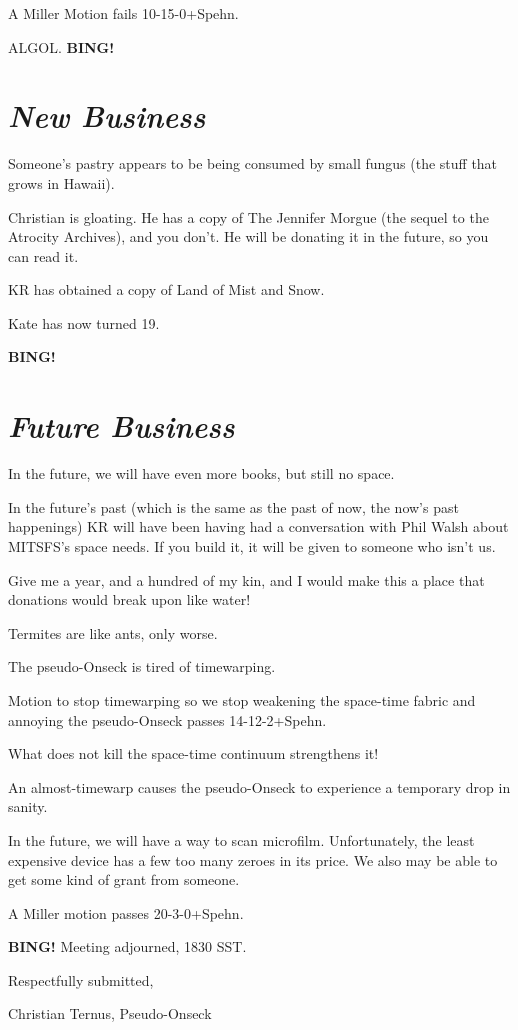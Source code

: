 \documentclass[10pt]{article}
\newcommand{\bing}{{\bf BING!} }
\newcommand{\goto}[1]{\bing \vskip 12pt \section*{{\em{#1}}}}
\begin{document}
A Miller Motion fails 10-15-0+Spehn.

ALGOL.
\goto{New Business}

Someone's pastry appears to be being consumed by small fungus (the stuff that grows in Hawaii).

Christian is gloating. He has a copy of The Jennifer Morgue (the sequel to the Atrocity Archives), and you don't. He will be donating it in the future, so you can read it.

KR has obtained a copy of Land of Mist and Snow.

Kate has now turned 19.

\goto{Future Business}

In the future, we will have even more books, but still no space.

In the future's past (which is the same as the past of now, the now's past happenings) KR will have been having had a conversation with Phil Walsh about MITSFS's space needs. If you build it, it will be given to someone who isn't us.

Give me a year, and a hundred of my kin, and I would make this a place that donations would break upon like water!

Termites are like ants, only worse.

The pseudo-Onseck is tired of timewarping.

Motion to stop timewarping so we stop weakening the space-time fabric and annoying the pseudo-Onseck passes 14-12-2+Spehn.

What does not kill the space-time continuum strengthens it!

An almost-timewarp causes the pseudo-Onseck to experience a temporary drop in sanity.

In the future, we will have a way to scan microfilm. Unfortunately, the least expensive device has a few too many zeroes in its price. We also may be able to get some kind of grant from someone. 

A Miller motion passes 20-3-0+Spehn.

\bing
\noindent
Meeting adjourned, 1830 SST.

\vspace{18pt}

\centerline{Respectfully submitted,}
\centerline{Christian Ternus, Pseudo-Onseck}
\end{document}
